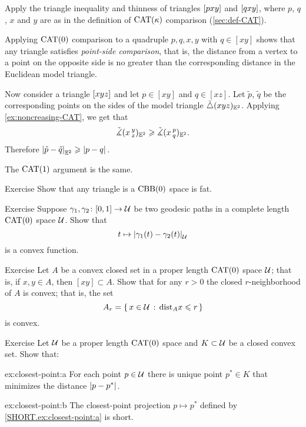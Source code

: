 Apply  the triangle inequality and thinness of triangles $[pxy]$ and $[qxy]$, where $p$, $q$, $x$ and $y$ are as in the definition of $\mathrm{CAT}(\kappa)$ comparison (\ref{sec:def-CAT}).

Applying $\mathrm{CAT}(0)$ comparison to a quadruple $p,q,x,y$ with $q\in [xy]$ shows that any triangle satisfies \emph{point-side comparison}, that is, the distance from a vertex to a  point on the opposite side is no greater than the corresponding distance in the Euclidean model triangle.  

Now consider a triangle $[xyz]$ and let $p\in [xy]$ and $q\in [xz]$.
Let $\tilde p$, $\tilde q$ be the corresponding points on the sides of the model triangle $\tilde\triangle({x}{y}{z})_{\mathbb{E}^2}$.
Applying \ref{ex:noncreasing-CAT}, we get that
\[\tilde\measuredangle(x\,{}^{y}_{z})_{\mathbb{E}^2} \geqslant \tilde\measuredangle(x\,{}^{p}_{q}) _{\mathbb{E}^2}.\]
Therefore $ \dist{\tilde p}{\tilde q}{\EE^2}\ge \dist{p}{q}{}$.

The $\mathrm{CAT}(1)$ argument is the same.
\qeds

\begin{thm}{Exercise}\label{ex:fat-triangle}
Show that any triangle is a $\mathrm{CBB}(0)$ space is fat. 
\end{thm}

\begin{thm}{Exercise}\label{ex:convex-dist}
Suppose $\gamma_1,\gamma_2\colon[0,1]\to \mathcal{U}$ be two geodesic paths in a complete length $\mathrm{CAT}(0)$ space $\mathcal{U}$.
Show that
\[t\mapsto\dist{\gamma_1(t)}{\gamma_2(t)}{\spc{U}}\]
is a convex function.
\end{thm}

\begin{thm}{Exercise}\label{ex:convex-nbhd}
Let $A$ be a convex closed set in a proper length $\mathrm{CAT}(0)$ space $\mathcal{U}$;
that is, if $x,y\in A$, then $[xy]\subset A$.
Show that for any $r>0$ the closed $r$-neighborhood of $A$ is convex;
that is, the set
\[A_r=\left\{\,{x\in \mathcal{U}}\,:\,{\mathrm{dist}_Ax\leqslant r}\,\right\}\]
is convex.
\end{thm}

\begin{thm}{Exercise}\label{ex:closest-point}
Let  $\mathcal{U}$ be a proper length $\mathrm{CAT}(0)$ space 
and $K\subset \mathcal{U}$ be a closed convex set.
Show that: 

\begin{subthm}{ex:closest-point:a}
For each point $p\in \mathcal{U}$ there is unique point $p^*\in K$ that minimizes the distance $\dist{p}{p^*}{}$.
\end{subthm}

\begin{subthm}{ex:closest-point:b}
The closest-point projection $p\mapsto p^*$ defined by \ref{SHORT.ex:closest-point:a} is short. 
\end{subthm}

\end{thm}

